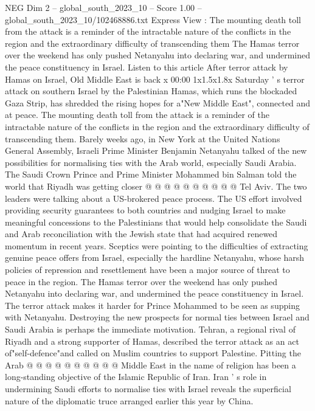 \begin{textsample}{NEG Dim 2 – global\_south\_2023\_10 – Score 1.00 – global\_south\_2023\_10/102468886.txt}  \label{ex:f2_neg_269}
Express View : The mounting death toll from the attack is a reminder of the intractable nature of the conflicts in the region and the extraordinary difficulty of transcending them The Hamas terror over the weekend has only pushed Netanyahu into declaring war, and undermined the peace constituency in Israel.
Listen to this article After terror attack by Hamas on Israel, Old Middle East is back x 00:00 1x1.5x1.8x Saturday ' s terror attack on southern Israel by the Palestinian Hamas, which runs the blockaded Gaza Strip, has shredded the rising hopes for a"New Middle East", connected and at peace.
The mounting death toll from the attack is a reminder of the intractable nature of the conflicts in the region and the extraordinary difficulty of transcending them.
Barely weeks ago, in New York at the United Nations General Assembly, Israeli Prime Minister Benjamin Netanyahu talked of the new possibilities for normalising ties with the Arab world, especially Saudi Arabia.
The Saudi Crown Prince and Prime Minister Mohammed bin Salman told the world that Riyadh was getting closer @ @ @ @ @ @ @ @ @ @ Tel Aviv.
The two leaders were talking about a US-brokered peace process.
The US effort involved providing security guarantees to both countries and nudging Israel to make meaningful concessions to the Palestinians that would help consolidate the Saudi and Arab reconciliation with the Jewish state that had acquired renewed momentum in recent years.
Sceptics were pointing to the difficulties of extracting genuine peace offers from Israel, especially the hardline Netanyahu, whose harsh policies of repression and resettlement have been a major source of threat to peace in the region.
The Hamas terror over the weekend has only pushed Netanyahu into declaring war, and undermined the peace constituency in Israel.
The terror attack makes it harder for Prince Mohammed to be seen as supping with Netanyahu.
Destroying the new prospects for normal ties between Israel and Saudi Arabia is perhaps the immediate motivation.
Tehran, a regional rival of Riyadh and a strong supporter of Hamas, described the terror attack as an act of"self-defence"and called on Muslim countries to support Palestine.
Pitting the Arab @ @ @ @ @ @ @ @ @ @ Middle East in the name of religion has been a long-standing objective of the Islamic Republic of Iran.
Iran ' s role in undermining Saudi efforts to normalise ties with Israel reveals the superficial nature of the diplomatic truce arranged earlier this year by China.

\end{textsample}
